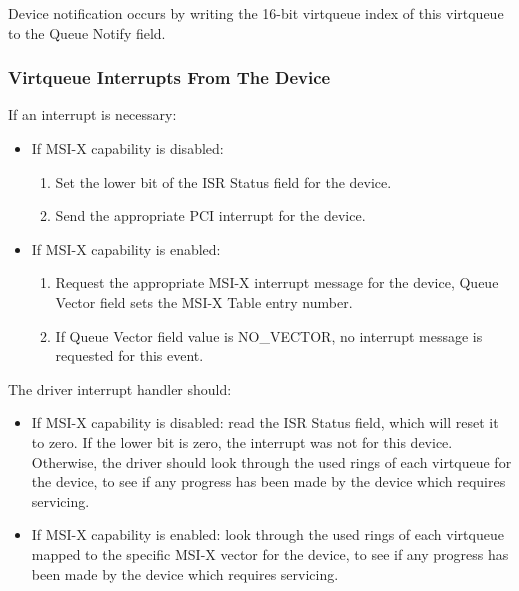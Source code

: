 Device notification occurs by writing the 16-bit virtqueue index
of this virtqueue to the Queue Notify field.

\subsubsection{Virtqueue Interrupts From The Device}\label{sec:Virtio Transport Options / Virtio Over PCI Bus / PCI-specific Initialization And Device Operation / Virtqueue Interrupts From The Device}

If an interrupt is necessary:

\begin{itemize}
  \item If MSI-X capability is disabled:
    \begin{enumerate}
    \item Set the lower bit of the ISR Status field for the device.

    \item Send the appropriate PCI interrupt for the device.
    \end{enumerate}

  \item If MSI-X capability is enabled:
    \begin{enumerate}
    \item Request the appropriate MSI-X interrupt message for the
      device, Queue Vector field sets the MSI-X Table entry
      number.

    \item If Queue Vector field value is NO_VECTOR, no interrupt
      message is requested for this event.
    \end{enumerate}
\end{itemize}

The driver interrupt handler should:

\begin{itemize}
  \item If MSI-X capability is disabled: read the ISR Status field,
  which will reset it to zero. If the lower bit is zero, the
  interrupt was not for this device. Otherwise, the driver
  should look through the used rings of each virtqueue for the
  device, to see if any progress has been made by the device
  which requires servicing.

  \item If MSI-X capability is enabled: look through the used rings of
  each virtqueue mapped to the specific MSI-X vector for the
  device, to see if any progress has been made by the device
  which requires servicing.
\end{itemize}

